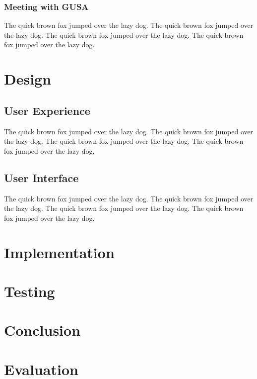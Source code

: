 \documentclass{l4proj}
\begin{document}
\subsection{Meeting with GUSA}
The quick brown fox jumped over the lazy dog.
The quick brown fox jumped over the lazy dog.
The quick brown fox jumped over the lazy dog.
The quick brown fox jumped over the lazy dog.

\chapter{Design}
\section{User Experience}
The quick brown fox jumped over the lazy dog.
The quick brown fox jumped over the lazy dog.
The quick brown fox jumped over the lazy dog.
The quick brown fox jumped over the lazy dog.
\section{User Interface}
The quick brown fox jumped over the lazy dog.
The quick brown fox jumped over the lazy dog.
The quick brown fox jumped over the lazy dog.
The quick brown fox jumped over the lazy dog.

\chapter{Implementation}
\chapter{Testing}

\chapter{Conclusion}

\chapter{Evaluation}
\end{document}
